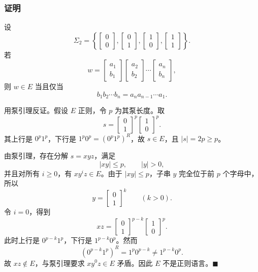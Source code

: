 \begin{answerred}
\subsubsection*{证明}

设
\[
    \Sigma_2=
    \left\{
    \begin{bmatrix}0\\0\end{bmatrix},
    \begin{bmatrix}0\\1\end{bmatrix},
    \begin{bmatrix}1\\0\end{bmatrix},
    \begin{bmatrix}1\\1\end{bmatrix}
    \right\}.
\]
若
\[
    w=
    \begin{bmatrix}a_1\\ b_1\end{bmatrix}
    \begin{bmatrix}a_2\\ b_2\end{bmatrix}
    \cdots
    \begin{bmatrix}a_n\\ b_n\end{bmatrix},
\]
则 $w\in E$ 当且仅当
\[
    b_1b_2\cdots b_n=a_na_{n-1}\cdots a_1.
\]

用泵引理反证。假设 $E$ 正则，令 $p$ 为其泵长度。取
\[
    s=
    \begin{bmatrix}0\\1\end{bmatrix}^{p}
    \begin{bmatrix}1\\0\end{bmatrix}^{p}.
\]
其上行是 $0^p1^p$，下行是 $1^p0^p=(0^p1^p)^R$，故 $s\in E$，且 $|s|=2p\ge p$。

由泵引理，存在分解 $s=xyz$，满足
\[
    |xy|\le p,\qquad |y|>0,
\]
并且对所有 $i\ge 0$，有 $xy^iz\in E$。由于 $|xy|\le p$，子串 $y$ 完全位于前 $p$ 个字母中，所以
\[
    y=
    \begin{bmatrix}0\\1\end{bmatrix}^{k}
    \qquad(k>0).
\]
令 $i=0$，得到
\[
    xz=
    \begin{bmatrix}0\\1\end{bmatrix}^{p-k}
    \begin{bmatrix}1\\0\end{bmatrix}^{p}.
\]
此时上行是 $0^{p-k}1^p$，下行是 $1^{p-k}0^p$。然而
\[
    (0^{p-k}1^p)^R=1^p0^{p-k}
    \ne
    1^{p-k}0^p.
\]
故 $xz\notin E$，与泵引理要求 $xy^0z\in E$ 矛盾。因此 $E$ 不是正则语言。$\blacksquare$


\end{answerred}
